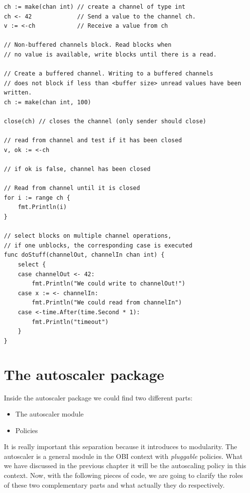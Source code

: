 \documentclass[12pt,twoside,cucitura]{toptesi}
\begin{document}
\begin{lstlisting}
ch := make(chan int) // create a channel of type int
ch <- 42             // Send a value to the channel ch.
v := <-ch            // Receive a value from ch

// Non-buffered channels block. Read blocks when 
// no value is available, write blocks until there is a read.

// Create a buffered channel. Writing to a buffered channels 
// does not block if less than <buffer size> unread values have been written.
ch := make(chan int, 100)

close(ch) // closes the channel (only sender should close)

// read from channel and test if it has been closed
v, ok := <-ch

// if ok is false, channel has been closed

// Read from channel until it is closed
for i := range ch {
    fmt.Println(i)
}

// select blocks on multiple channel operations, 
// if one unblocks, the corresponding case is executed
func doStuff(channelOut, channelIn chan int) {
    select {
    case channelOut <- 42:
        fmt.Println("We could write to channelOut!")
    case x := <- channelIn:
        fmt.Println("We could read from channelIn")
    case <-time.After(time.Second * 1):
        fmt.Println("timeout")
    }
}
\end{lstlisting}

\section{The autoscaler package}
Inside the autoscaler package we could find two different parts:
\begin{itemize}
	\item The autoscaler module
	\item Policies
\end{itemize}

It is really important this separation because it introduces to modularity. The autoscaler is a general module in the OBI context with \textit{pluggable} policies. What we have discussed in the previous chapter it will be the autoscaling policy in this context. Now, with the following pieces of code, we are going to clarify the roles of these two complementary parts and what actually they do respectively.
\end{document}
